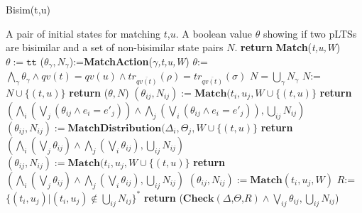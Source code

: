 \documentclass[a4paper,UKenglish,cleveref, autoref]{lipics-v2019}
\begin{document}
\begin{algorithm}[htbp]
\caption{Bisim(t,u)}
\label{alg:bisim}
\begin{algorithmic}[1]
\Require A pair of initial states for matching $t$,$u$.
\Ensure A boolean value $\theta$ showing if two pLTSs are bisimilar and a set of non-bisimilar state pairs $N$.
\State \textbf{return} \textbf{Match}(\textit{t,u,W})
\EndFunction
\State
{}
    \State $\theta:=\texttt{tt}$
\Else
        \State ($\theta_{\gamma} ,N_{\gamma}$):=\textbf{MatchAction}(\textit{$\gamma$,t,u,W})
    \EndFor
    \State $\theta$:=$\bigwedge_\gamma\theta_\gamma\wedge qv(t)=qv(u)\wedge tr_{\overline{qv(t)}}(\rho)=tr_{\overline{qv(t)}}(\sigma)$
    \State $N=\bigcup_{\gamma}N_\gamma$
     $N$:=$N\cup \{(t,u)\}$ \EndIf
\EndIf
\State \textbf{return} ($\theta,N$) 
\EndFunction
\State
{}
\Switch{$\gamma$}
    \State $(\theta_{ij},N_{ij}):=\textbf{Match}(t_i,u_j,W\cup \{(t,u)\}$
\EndFor
\EndFor
\State \textbf{return} $(\bigwedge_{i}(\bigvee_j(\theta_{ij}\wedge e_i=e'_j))\wedge\bigwedge_{j}(\bigvee_i(\theta_{ij}\wedge e_i=e'_j)),\bigcup_{ij}N_{ij})$
\EndCase
\Case{$\tau$}
 
    \State $(\theta_{ij},N_{ij}):=\textbf{MatchDistribution}(\Delta_i,\Theta_j,W\cup \{(t,u)\}$
\EndFor
\EndFor
\State \textbf{return} $(\bigwedge_{i}(\bigvee_j\theta_{ij})\wedge\bigwedge_{j}(\bigvee_i\theta_{ij}),\bigcup_{ij}N_{ij})$
\EndCase
\Otherwise{}
    \State $(\theta_{ij},N_{ij}):=\textbf{Match}(t_i,u_j,W\cup \{(t,u)\}$
\EndFor
\EndFor
\State \textbf{return} $(\bigwedge_{i}(\bigvee_j\theta_{ij})\wedge\bigwedge_{j}(\bigvee_i\theta_{ij}),\bigcup_{ij}N_{ij})$
\EndOtherwise
\EndSwitch
\EndFunction
\State
{}
    \State $(\theta_{ij},N_{ij}):=\textbf{Match}(t_i,u_j,W)$
\EndFor
\State $\textit{R}$:=$\{(t_i,u_j)|(t_i,u_j)\notin \bigcup_{ij}N_{ij}\}^*$
\State \textbf{return} ($\textbf{Check}(\textit{$\Delta$,$\Theta$,$R$})\wedge\bigvee_{ij}\theta_{ij},\bigcup_{ij}N_{ij}$)
\EndFunction
\end{algorithmic}
\end{algorithm}
\end{document}
